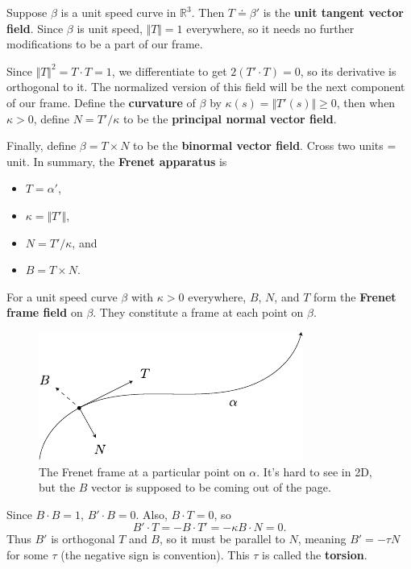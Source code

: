 \documentclass[twoside,10pt]{report}
\begin{document}
Suppose $\beta$ is a unit speed curve in $\mathbb{R}^3$. Then $T\doteq\beta'$ is the \textbf{unit tangent vector field}. Since $\beta$ is unit speed, $\Vert{T}\Vert=1$ everywhere, so it needs no further modifications to be a part of our frame.

Since $\Vert{T}\Vert^2 = T\cdot T=1$, we differentiate to get $2(T'\cdot T)=0$, so its derivative is orthogonal to it. The normalized version of this field will be the next component of our frame. Define the \textbf{curvature} of $\beta$ by $\kappa(s) = \Vert{T'(s)}\Vert\geq 0$, then when $\kappa > 0$, define $N = T' / \kappa$ to be the \textbf{principal normal vector field}.

Finally, define $\beta = T \times N$ to be the \textbf{binormal vector field}. {\color{red}Cross two units = unit.} In summary, the \textbf{Frenet apparatus} is
\begin{itemize}
	\item $T=\alpha'$,
	\item $\kappa = \Vert{T'}\Vert$,
	\item $N = T' / \kappa$, and
	\item $B = T \times N$.
\end{itemize}
\begin{defn}[]
	For a unit speed curve $\beta$ with $\kappa>0$ everywhere, $B$, $N$, and $T$ form the \textbf{Frenet frame field} on $\beta$. They constitute a frame at each point on $\beta$.
\end{defn}

\begin{figure}[H]
	\centering
	\includegraphics[scale=1.5]{fig/frenet.pdf}
	\caption{The Frenet frame at a particular point on $\alpha$. It's hard to see in 2D, but the $B$ vector is supposed to be coming out of the page.}
\end{figure}

Since $B \cdot B=1$, $B' \cdot B = 0$. Also, $B \cdot T = 0$, so
	\[
	B' \cdot T = -B \cdot T' = -\kappa B \cdot N = 0.
	\]
	Thus $B'$ is orthogonal $T$ and $B$, so it must be parallel to $N$, meaning $B' = -\tau N$ for some $\tau$ (the negative sign is convention). This $\tau$ is called the \textbf{torsion}.
\end{document}
